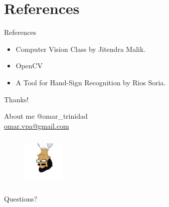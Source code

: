 \documentclass{beamer}
\begin{document}
\section{References}
\begin{frame}{References}
  \begin{itemize}[<+-| alert@+ >]
    \item Computer Vision Class by Jitendra Malik.
    \item OpenCV
    \item A Tool for Hand-Sign Recognition by Rios Soria.
  \end{itemize}
\end{frame}

\begin{frame}{Thanks!}
  \begin{block}{About me}
   @omar\_trinidad \\
   \url{omar.vpa@gmail.com}
  \end{block}
  \begin{figure}
    \centering
     \includegraphics[width = 2cm, height = 2.5cm]{./omar_simpson_version.jpg}
  \end{figure}
  \begin{block}{}
   Questions?
  \end{block}

\end{frame}
\end{document}
